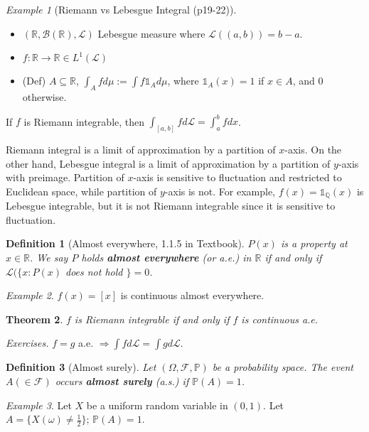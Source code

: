 \documentclass[12pt]{report}
\renewcommand{\1}{\mathbb{1}}
\renewcommand{\subset}{\subseteq}
\theoremstyle{break}
\newtheorem{thm}{Theorem}[section] %
\theoremstyle{newdef}
\newtheorem{defn}[thm]{Definition} %
\theoremstyle{remark}
\newtheorem*{exmp}{Example} %
\begin{document}
\begin{exmp}[Riemann vs Lebesgue Integral (p19-22)]
\leavevmode
\begin{itemize}
\item $(\mathbb{R}, \mathcal{B}(\mathbb{R}), \mathcal{L})$ Lebesgue measure where $\mathcal{L}((a,b)) = b-a$.
\item $f : \mathbb{R} \rightarrow \mathbb{R} \in L^1(\mathcal{L})$
\item (Def) $A \subset \mathbb{R}$, $\int_A fd\mu := \int f \mathbb{1}_A d\mu$, where $\mathbb{1}_A(x) = 1$ if $x \in A$, and $0$ otherwise.
\end{itemize}
If $f$ is Riemann integrable, then $\int_{[a,b]} fd\mathcal{L} = \int_a^b fdx$.

Riemann integral is a limit of approximation by a partition of $x$-axis.
On the other hand, Lebesgue integral is a limit of approximation by a partition of $y$-axis with preimage.
Partition of $x$-axis is sensitive to fluctuation and restricted to Euclidean space, while partition of $y$-axis is not.
For example, $f(x) = \mathbb{1}_\mathbb{Q}(x)$ is Lebesgue integrable, but it is not Riemann integrable since it is sensitive to fluctuation.
\end{exmp}

\begin{defn}[Almost everywhere, 1.1.5 in Textbook]
$P(x)$ is a property at $x \in \mathbb{R}$.
We say $P$ holds \textbf{almost everywhere} (or a.e.) in $\mathbb{R}$ if and only if
$\mathcal{L}(\{x:P(x)$ does not hold $\} = 0$.
\end{defn}

\begin{exmp}
$f(x) = [x]$ is continuous almost everywhere.
\end{exmp}


\begin{thm}
$f$ is Riemann integrable if and only if $f$ is continuous a.e.
\end{thm}

\textit{Exercises.} $f = g$ a.e. $\Rightarrow \int fd\mathcal{L} = \int g d\mathcal{L}$.

\begin{defn}[Almost surely]
Let $(\Omega, \mathcal{F}, \mathbb{P})$ be a probability space.
The event $A (\in \mathcal{F})$ occurs \textbf{almost surely} (a.s.) if $\mathbb{P}(A) = 1$.
\end{defn}

\begin{exmp}
Let $X$ be a uniform random variable in $(0,1)$.
Let $A = \{ X(\omega) \neq \frac{1}{2}\}$; $\mathbb{P}(A) = 1$.
\end{exmp}
\end{document}
